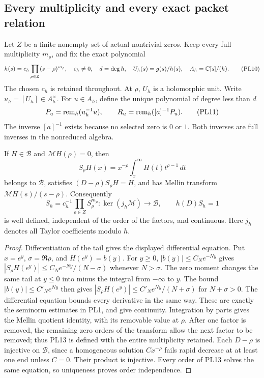 \subsection{Every multiplicity and every exact packet relation}
Let \(Z\) be a finite nonempty set of actual nontrivial zeros.
Keep every full multiplicity \(m_\rho\), and fix the exact polynomial
\[
 h(s)=c_h\prod_{\rho\in Z}(s-\rho)^{m_\rho},\quad c_h\ne0,\quad
 d=\deg h,\quad U_h(s)=g(s)/h(s),\quad A_h=\mathbb C[s]/(h).
 \tag{PL10}\label{pl:pl:packet}
\]
The chosen \(c_h\) is retained throughout. At \(\rho\), \(U_h\) is
a holomorphic unit. Write \(u_h=[U_h]\in A_h^\times\).
For \(u\in A_h\), define the unique polynomial of degree less than \(d\)
\[
 P_u=\operatorname{rem}_h(u_h^{-1}u),\qquad
 R_u=\operatorname{rem}_h([a]^{-1}P_u).
 \tag{PL11}\label{pl:pl:remainders}
\]
The inverse \([a]^{-1}\) exists because no selected zero is \(0\)
or \(1\). Both inverses are full inverses in the nonreduced algebra.

\begin{lemma}\label{pl:lem:euler}
If \(H\in\mathscr B\) and \(\mathcal M H(\rho)=0\), then
\[
 S_\rho H(x)=x^{-\rho}\int_x^\infty H(t)t^{\rho-1}\,dt
 \tag{PL12}\label{pl:pl:euler}
\]
belongs to \(\mathscr B\), satisfies \((D-\rho)S_\rho H=H\), and has
Mellin transform \(\mathcal M H(s)/(s-\rho)\). Consequently
\[
 S_h=c_h^{-1}\prod_{\rho\in Z}S_\rho^{m_\rho}:
       \ker(j_h\mathcal M)\longrightarrow\mathscr B,\qquad h(D)S_h=1
 \tag{PL13}\label{pl:pl:inverse-h}
\]
is well defined, independent of the order of the factors, and
continuous. Here \(j_h\) denotes all Taylor coefficients modulo \(h\).
\end{lemma}
\begin{proof}
Differentiation of the tail gives the displayed differential equation.
Put \(x=e^y\), \(\sigma=\Re\rho\), and \(H(e^y)=b(y)\).
For \(y\ge0\), \(|b(y)|\le C_Ne^{-Ny}\) gives
\(|S_\rho H(e^y)|\le C_Ne^{-Ny}/(N-\sigma)\) whenever \(N>\sigma\).
The zero moment changes the same tail at \(y\le0\) into minus the
integral from \(-\infty\) to \(y\). The bound
\(|b(y)|\le C'_Ne^{Ny}\) then gives
\(|S_\rho H(e^y)|\le C'_Ne^{Ny}/(N+\sigma)\) for \(N+\sigma>0\).
The differential equation bounds every derivative in the same way.
These are exactly the seminorm estimates in PL1, and give continuity.
Integration by parts gives the Mellin quotient identity, with its
removable value at \(\rho\).
After one factor is removed, the remaining zero orders of the
transform allow the next factor to be removed; thus PL13 is defined
with the entire multiplicity retained. Each \(D-\rho\) is injective
on \(\mathscr B\), since a homogeneous solution \(C x^{-\rho}\) fails rapid
decrease at at least one end unless \(C=0\). Their product is
injective. Every order of PL13 solves the same equation, so
uniqueness proves order independence.
\end{proof}

